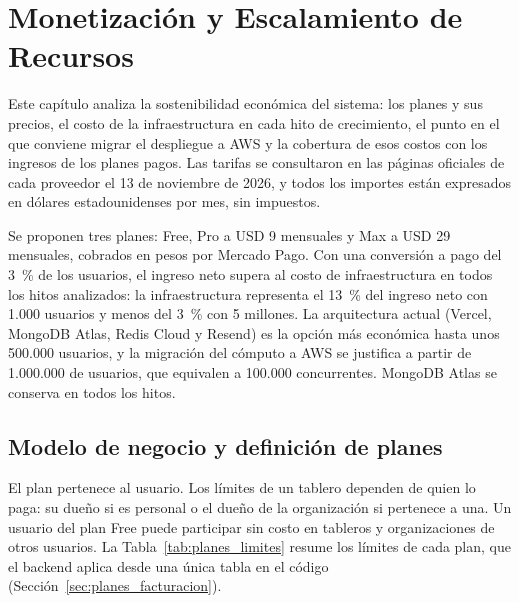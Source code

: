 \chapter{Monetización y Escalamiento de Recursos}
\label{chap:monetizacion}

Este capítulo analiza la sostenibilidad económica del sistema: los planes y sus precios, el costo de la infraestructura en cada hito de crecimiento, el punto en el que conviene migrar el despliegue a AWS y la cobertura de esos costos con los ingresos de los planes pagos. Las tarifas se consultaron en las páginas oficiales de cada proveedor el 13 de noviembre de 2026, y todos los importes están expresados en dólares estadounidenses por mes, sin impuestos.

Se proponen tres planes: Free, Pro a USD 9 mensuales y Max a USD 29 mensuales, cobrados en pesos por Mercado Pago. Con una conversión a pago del 3~\% de los usuarios, el ingreso neto supera al costo de infraestructura en todos los hitos analizados: la infraestructura representa el 13~\% del ingreso neto con 1.000 usuarios y menos del 3~\% con 5 millones. La arquitectura actual (Vercel, MongoDB Atlas, Redis Cloud y Resend) es la opción más económica hasta unos 500.000 usuarios, y la migración del cómputo a AWS se justifica a partir de 1.000.000 de usuarios, que equivalen a 100.000 concurrentes. MongoDB Atlas se conserva en todos los hitos.

\section{Modelo de negocio y definición de planes}
El plan pertenece al usuario. Los límites de un tablero dependen de quien lo paga: su dueño si es personal o el dueño de la organización si pertenece a una. Un usuario del plan Free puede participar sin costo en tableros y organizaciones de otros usuarios. La Tabla~\ref{tab:planes_limites} resume los límites de cada plan, que el backend aplica desde una única tabla en el código (Sección~\ref{sec:planes_facturacion}).

